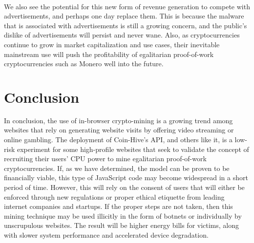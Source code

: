 \\
We also see the potential for this new form of revenue generation to compete with advertisements, and perhaps one day replace them. This is because the malware that is associated with advertisements is still a growing concern, and the public’s dislike of advertisements will persist and never wane. Also, as cryptocurrencies continue to grow in market capitalization and use cases, their inevitable mainstream use will push the profitability of egalitarian proof-of-work cryptocurrencies such as Monero well into the future.

\begin{center}
\end{center}



\section{Conclusion}
In conclusion, the use of in-browser crypto-mining is a growing trend among websites that rely on generating website visits by offering video streaming or online gambling. The deployment of Coin-Hive’s API, and others like it, is a low-risk experiment for some high-profile websites that seek to validate the concept of recruiting their users’ CPU power to mine egalitarian proof-of-work cryptocurrencies. If, as we have determined, the model can be proven to be financially viable, this type of JavaScript code may become widespread in a short period of time. However, this will rely on the consent of users that will either be enforced through new regulations or proper ethical etiquette from leading internet companies and startups. If the proper steps are not taken, then this mining technique may be used illicitly in the form of botnets or individually by unscrupulous websites. The result will be higher energy bills for victims, along with slower system performance and accelerated device degradation.

